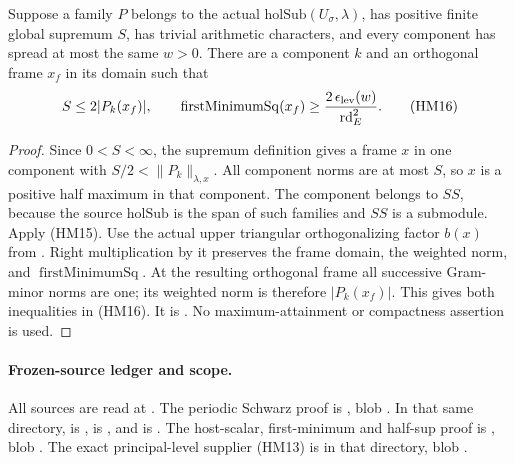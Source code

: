 \begin{srproposition}\label{prop:sr-source-orthogonal-halfmax}
Suppose a family \(P\) belongs to the actual
\(\mathrm{holSub}(U_\sigma,\lambda)\), has positive finite
global supremum \(S\), has trivial arithmetic characters, and
every component has spread at most the same \(w>0\).
There are a component \(k\) and an orthogonal frame \(x_f\) in
its domain such that
\[
              S\le2|P_k(x_f)|,\qquad
 \operatorname{firstMinimumSq}(x_f)
             \ge {2\,\epsilon_{\rm lev}(w)\over\mathrm{rd}_E^2}.
 \tag{HM16}\label{eq:sr-source-orthogonal-halfmax}
\]
\end{srproposition}
\begin{proof}
Since \(0<S<\infty\), the supremum definition gives a frame
\(x\) in one component with \(S/2<\|P_k\|_{\lambda,x}\).
All component norms are at most \(S\), so \(x\) is a positive
half maximum in that component.
The component belongs to \(SS\), because the source
\(\mathrm{holSub}\) is the span of such families and \(SS\)
is a submodule.
Apply (HM15).
Use the actual upper triangular orthogonalizing factor \(b(x)\)
from .
Right multiplication by it preserves the frame domain, the
weighted norm, and \(\operatorname{firstMinimumSq}\).
At the resulting orthogonal frame all successive Gram-minor
norms are one; its weighted norm is therefore \(|P_k(x_f)|\).
This gives both inequalities in (HM16).
It is .
No maximum-attainment or compactness assertion is used.
\end{proof}

\paragraph{Frozen-source ledger and scope.}
All sources are read at .
The periodic Schwarz proof is
,
blob .
In that same directory,
 is
,
 is
, and
 is
.
The host-scalar, first-minimum and half-sup proof is
,
blob .
The exact principal-level supplier (HM13) is
 in
that directory, blob .


